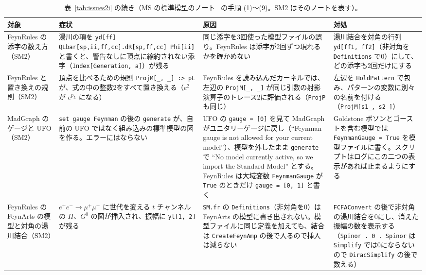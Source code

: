 \documentclass[a4paper,10pt]{ltjsarticle}
\begin{document}
\begin{table}[tbp]
\centering\footnotesize
\caption{表~\ref{tab:issues2i} の続き（$\overline{\mathrm{MS}}$ の標準模型のノート~\cite{smmsbarnote} の手順 (1)〜(9)。SM2 はそのノートを表す）。}
\label{tab:issues2j}
\begin{tabularx}{\linewidth}{>{\raggedright\arraybackslash}p{2.4cm}>{\raggedright\arraybackslash}X>{\raggedright\arraybackslash}X>{\raggedright\arraybackslash}X}
\toprule
\textbf{対象} & \textbf{症状} & \textbf{原因} & \textbf{対処} \\
\midrule
FeynRules の添字の数え方（SM2） & 湯川の項を \texttt{yd[ff] QLbar[sp,ii,ff,cc].}\allowbreak\texttt{dR[sp,ff,cc] Phi[ii]} と書くと、警告なしに頂点に縮約されない添字（\texttt{Index[Generation, a]}）が残る & 同じ添字を3回使った模型ファイルの誤り。FeynRules は添字が2回ずつ現れるかを確かめない & 湯川結合を対角の行列 \texttt{yd[ff1, ff2]}（非対角を \texttt{Definitions} で0）にして、どの添字も2回だけにする \\
FeynRules と置き換えの規則（SM2） & 頂点を比べるための規則 \texttt{ProjM[\_, \_] :> pL} が、式の中の整数2をすべて置き換える（$e^2$ が $e^{p_L}$ になる） & FeynRules を読み込んだカーネルでは、左辺の \texttt{ProjM[\_, \_]} が同じ引数の射影演算子のトレース2に評価される（\texttt{ProjP} も同じ） & 左辺を \texttt{HoldPattern} で包み、パターンの変数に別々の名前を付ける（\texttt{ProjM[s1\_, s2\_]}） \\
MadGraph のゲージと UFO（SM2） & \texttt{set gauge Feynman} の後の \texttt{generate} が、自前の UFO ではなく組み込みの標準模型の図を作る。エラーにはならない & UFO の \texttt{gauge = [0]} を見て MadGraph がユニタリーゲージに戻し（``Feynman gauge is not allowed for your current model''）、模型を外したまま \texttt{generate} で ``No model currently active, so we import the Standard Model'' とする。FeynRules は大域変数 \texttt{FeynmanGauge} が \texttt{True} のときだけ \texttt{gauge = [0, 1]} と書く & Goldstone ボソンとゴーストを含む模型では \texttt{FeynmanGauge = True} を模型ファイルに書く。スクリプトはログにこの二つの表示があれば止まるようにする \\
FeynRules の FeynArts の模型と対角の湯川結合（SM2） & $e^+e^-\to\mu^+\mu^-$ に世代を変える $t$ チャンネルの $H$、$G^0$ の図が挿入され、振幅に \texttt{yl[1, 2]} が残る & \texttt{SM.fr} の \texttt{Definitions}（非対角を0）は FeynArts の模型に書き出されない。模型ファイルに同じ定義を加えても、結合は \texttt{CreateFeynAmp} の後で入るので挿入は減らない & \texttt{FCFAConvert} の後で非対角の湯川結合を0にし、消えた振幅の数を表示する（\texttt{Spinor . 0 . Spinor} は \texttt{Simplify} では0にならないので \texttt{DiracSimplify} の後で数える） \\

\end{tabularx}
\end{table}
\end{document}
